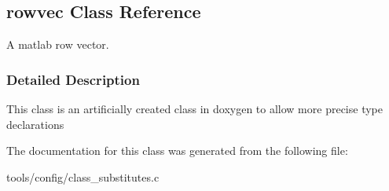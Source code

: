\hypertarget{classrowvec}{}\subsection{rowvec Class Reference}
\label{classrowvec}


A matlab row vector.  




\subsubsection{Detailed Description}
This class is an artificially created class in doxygen to allow more precise type declarations 

The documentation for this class was generated from the following file\+:\begin{DoxyCompactItemize}
\item 
tools/config/class\+\_\+substitutes.\+c\end{DoxyCompactItemize}
